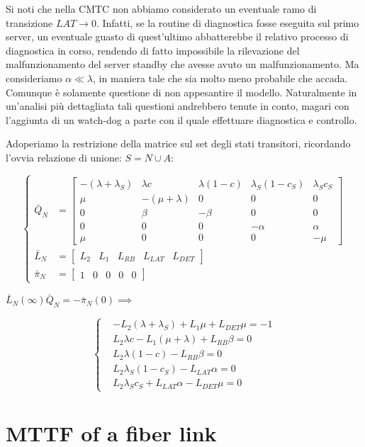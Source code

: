 Si noti che nella CMTC non abbiamo considerato un eventuale ramo di transizione $LAT\rightarrow 0$. Infatti, se la routine di diagnostica fosse eseguita sul primo server, un eventuale guasto di quest'ultimo abbatterebbe il relativo processo di diagnostica in corso, rendendo di fatto impossibile la rilevazione del malfunzionamento del server standby che avesse avuto un malfunzionamento. Ma consideriamo $\alpha\ll \lambda$, in maniera tale che sia molto meno probabile che accada. Comunque è solamente questione di non appesantire il modello. Naturalmente in un'analisi più dettagliata tali questioni andrebbero tenute in conto, magari con l'aggiunta di un watch-dog a parte con il quale effettuare diagnostica e controllo.

Adoperiamo la restrizione della matrice sul set degli stati transitori, ricordando l'ovvia relazione di unione: $S = N\cup A$:

\[
	\left\{
	\begin{aligned}
	\bar{Q}_N &= \begin{bmatrix}-(\lambda+\lambda_S)&\lambda c&\lambda(1-c)&\lambda_S(1-c_S)&\lambda_S c_S\\ \mu&-(\mu+\lambda)&0&0&0\\0&\beta&-\beta&0&0\\0&0&0&-\alpha&\alpha\\ \mu&0&0&0&-\mu\end{bmatrix}\\
	\bar{L}_N &=\begin{bmatrix}L_2&L_1&L_{RB}&L_{LAT}&L_{DET}\end{bmatrix}\\
	\bar{\pi}_N &=\begin{bmatrix}1&0&0&0&0\end{bmatrix}
	\end{aligned}
	\right.
\]

$\bar{L}_N(\infty)\bar{Q}_N = -\bar{\pi}_N(0) \implies$

\[	
	\left\{
	\begin{aligned}
	&-L_2(\lambda+\lambda_S)+L_1\mu+L_{DET}\mu = -1\\
	&L_2\lambda c -L_1(\mu+\lambda) + L_{RB}\beta = 0\\
	&L_2\lambda(1-c)-L_{RB}\beta = 0\\
	&L_2\lambda_S(1-c_S)-L_{LAT}\alpha = 0\\
	&L_2\lambda_S c_S + L_{LAT}\alpha - L_{DET}\mu = 0
	\end{aligned}
	\right.
\]

\section{MTTF of a fiber link}


